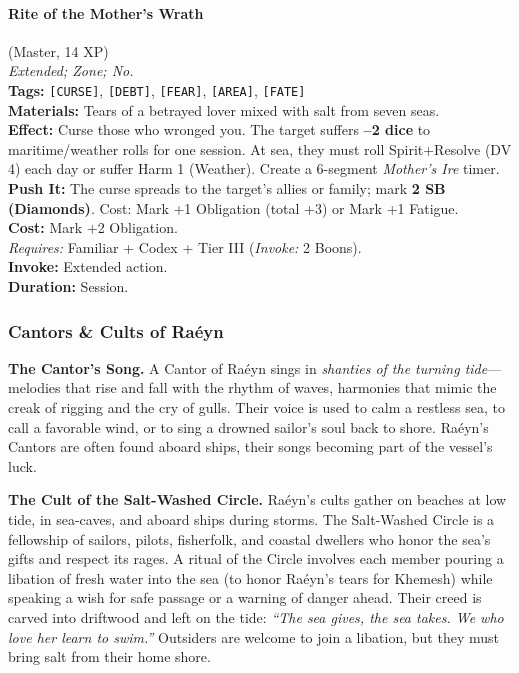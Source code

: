 \paragraph{Rite of the Mother's Wrath} (Master, 14 XP) \hfill \\
\emph{Extended; Zone; No.} \\
\textbf{Tags:} \texttt{[CURSE]}, \texttt{[DEBT]}, \texttt{[FEAR]}, \texttt{[AREA]}, \texttt{[FATE]} \\
\textbf{Materials:} Tears of a betrayed lover mixed with salt from seven seas. \\
\textbf{Effect:} Curse those who wronged you. The target suffers \textbf{--2 dice} to maritime/weather rolls for one session. At sea, they must roll Spirit+Resolve (DV 4) each day or suffer Harm 1 (Weather). Create a 6-segment \textit{Mother's Ire} timer. \\
\textbf{Push It:} The curse spreads to the target's allies or family; mark \textbf{2 SB (Diamonds)}. Cost: Mark +1 Obligation (total +3) or Mark +1 Fatigue. \\
\textbf{Cost:} Mark +2 Obligation. \\
\textit{Requires:} Familiar + Codex + Tier III (\textit{Invoke:} 2 Boons). \\
\textbf{Invoke:} Extended action. \\
\textbf{Duration:} Session.

\subsubsection*{Cantors \& Cults of Raéyn}

\textbf{The Cantor's Song.} A Cantor of Raéyn sings in \textit{shanties of the turning tide}---melodies that rise and fall with the rhythm of waves, harmonies that mimic the creak of rigging and the cry of gulls. Their voice is used to calm a restless sea, to call a favorable wind, or to sing a drowned sailor's soul back to shore. Raéyn's Cantors are often found aboard ships, their songs becoming part of the vessel's luck.

\textbf{The Cult of the Salt-Washed Circle.} Raéyn's cults gather on beaches at low tide, in sea-caves, and aboard ships during storms. The Salt-Washed Circle is a fellowship of sailors, pilots, fisherfolk, and coastal dwellers who honor the sea's gifts and respect its rages. A ritual of the Circle involves each member pouring a libation of fresh water into the sea (to honor Raéyn's tears for Khemesh) while speaking a wish for safe passage or a warning of danger ahead. Their creed is carved into driftwood and left on the tide: \textit{``The sea gives, the sea takes. We who love her learn to swim.''} Outsiders are welcome to join a libation, but they must bring salt from their home shore.

